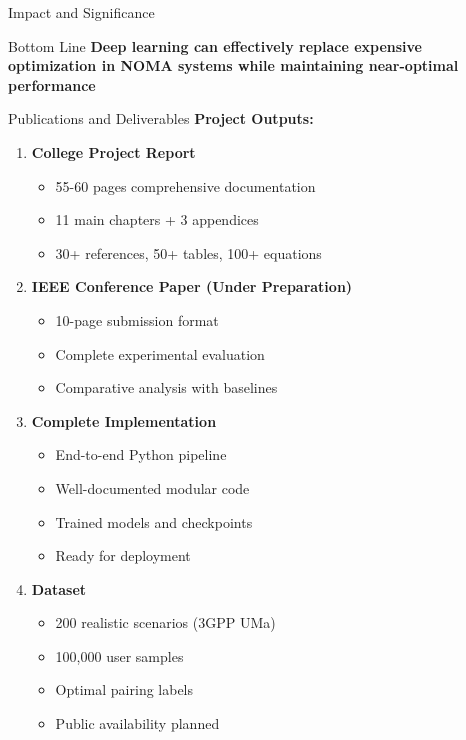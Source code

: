 \documentclass[aspectratio=169]{beamer}
\begin{document}
\begin{frame}{Impact and Significance}
    \vspace{0.3cm}
    
    \begin{exampleblock}{Bottom Line}
        \textbf{Deep learning can effectively replace expensive optimization in NOMA systems while maintaining near-optimal performance}
    \end{exampleblock}
\end{frame}

\begin{frame}{Publications and Deliverables}
    \textbf{Project Outputs:}
    \begin{enumerate}
        \item \textbf{College Project Report}
        \begin{itemize}
            \item 55-60 pages comprehensive documentation
            \item 11 main chapters + 3 appendices
            \item 30+ references, 50+ tables, 100+ equations
        \end{itemize}
        
        \item \textbf{IEEE Conference Paper (Under Preparation)}
        \begin{itemize}
            \item 10-page submission format
            \item Complete experimental evaluation
            \item Comparative analysis with baselines
        \end{itemize}
        
        \item \textbf{Complete Implementation}
        \begin{itemize}
            \item End-to-end Python pipeline
            \item Well-documented modular code
            \item Trained models and checkpoints
            \item Ready for deployment
        \end{itemize}
        
        \item \textbf{Dataset}
        \begin{itemize}
            \item 200 realistic scenarios (3GPP UMa)
            \item 100,000 user samples
            \item Optimal pairing labels
            \item Public availability planned
        \end{itemize}
    \end{enumerate}
\end{frame}
\end{document}
